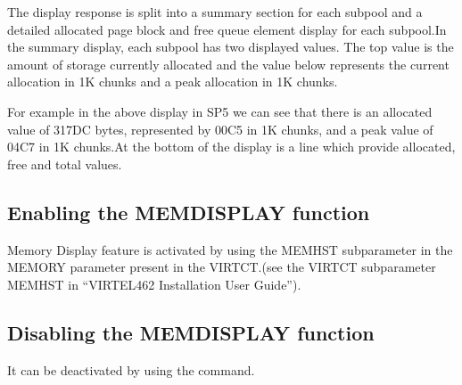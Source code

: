 \documentclass[letterpaper,10pt,english]{sphinxmanual}
\begin{document}
\sphinxAtStartPar
The display response is split into a summary section for each subpool and a detailed allocated page block and free queue element display for each subpool.In the summary display, each subpool has two displayed values. The top value is the amount of storage currently allocated and the value below represents the current allocation in 1K chunks and a peak allocation in 1K chunks.

\sphinxAtStartPar
For example in the above display in SP5 we can see that there is an allocated value of 317DC bytes, represented by 00C5 in 1K chunks, and a peak value of 04C7 in 1K chunks.At the bottom of the display is a line which provide allocated, free and total values.

\ignorespaces 

\subsection{Enabling the MEMDISPLAY function}
\label{\detokenize{audit_operations_ and_performance:enabling-the-memdisplay-function}}\label{\detokenize{audit_operations_ and_performance:index-12}}
\sphinxAtStartPar
Memory Display feature is activated by using the MEMHST subparameter in the MEMORY parameter present in the VIRTCT.(see the VIRTCT subparameter MEMHST in “VIRTEL462 Installation User Guide”).

\ignorespaces 

\subsection{Disabling the MEMDISPLAY function}
\label{\detokenize{audit_operations_ and_performance:disabling-the-memdisplay-function}}\label{\detokenize{audit_operations_ and_performance:index-13}}
\sphinxAtStartPar
It can be deactivated by using the command.

\begin{sphinxVerbatim}[commandchars=\\\{\}]
 
\end{sphinxVerbatim}
\end{document}
